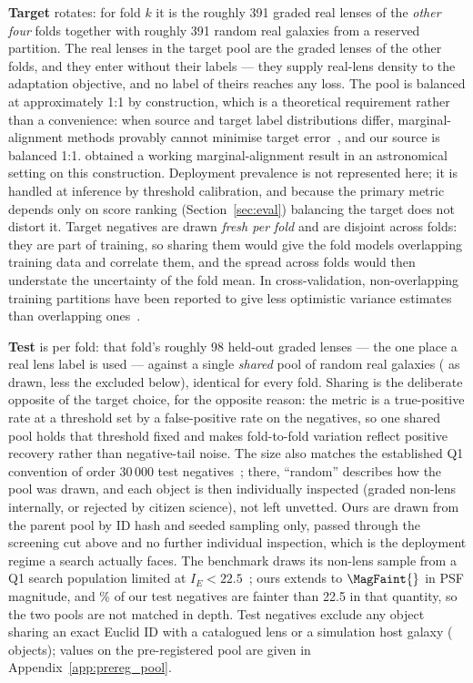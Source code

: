 \textbf{Target} rotates: for fold $k$ it is the roughly 391 graded real lenses of the
\emph{other four} folds together with roughly 391 random real galaxies from a reserved
partition. The real lenses in the target pool are the graded lenses of the other folds,
and they enter without their labels --- they supply real-lens density to the adaptation
objective, and no label of theirs reaches any loss. The pool is balanced at approximately
1:1 by construction, which is a theoretical requirement rather than a convenience: when
source and target label distributions differ, marginal-alignment methods provably cannot
minimise target error~\citep{zhao2020gls, classimbalanceda}, and our source is balanced 1:1.
\citet{parul2024} obtained a working marginal-alignment result in an astronomical setting
on this construction. Deployment prevalence is not represented here; it is handled at
inference by threshold calibration, and because the primary metric depends only on score
ranking (Section~\ref{sec:eval}) balancing the target does not distort it. Target
negatives are drawn \emph{fresh per fold} and are disjoint across folds: they are part of
training, so sharing them would give the fold models overlapping training data and
correlate them, and the spread across folds would then understate the uncertainty of the
fold mean. In cross-validation, non-overlapping training partitions have been reported to
give less optimistic variance estimates than overlapping ones~\citep{irredundant_kfold}.

\textbf{Test} is per fold: that fold's roughly 98 held-out graded lenses --- the one place
a real lens label is used --- against a single \emph{shared} pool of \TestNegDOne{} random real
galaxies (\TestNegDrawn{} as drawn, less the \DOneRemoved{} excluded below), identical for every fold. Sharing is the deliberate opposite of the target
choice, for the opposite reason: the metric is a true-positive rate at a threshold set by
a false-positive rate on the negatives, so one shared pool holds that threshold fixed and
makes fold-to-fold variation reflect positive recovery rather than negative-tail noise.
The size also matches the established Q1 convention of order 30\,000 test
negatives~\citep{lines2025simstosky, astrovink}; there, ``random'' describes how the pool
was drawn, and each object is then individually inspected (graded non-lens internally, or
rejected by citizen science), not left unvetted. Ours are drawn from the parent pool by ID hash and seeded sampling only, passed
through the screening cut above and no further individual inspection, which is
the deployment regime a search actually faces. The benchmark draws its non-lens sample from a Q1
search population limited at $I_E < 22.5$~\citep{lines2025simstosky}; ours extends to $\MagFaint{}$ in PSF magnitude, and
\FracFaintTest{}\% of our test negatives are fainter than 22.5 in that quantity, so the two
pools are not matched in depth. Test negatives exclude any object sharing an
exact Euclid ID with a catalogued lens or a simulation host galaxy (\DOneRemoved{}
objects); values on the pre-registered pool are given in Appendix~\ref{app:prereg_pool}.

